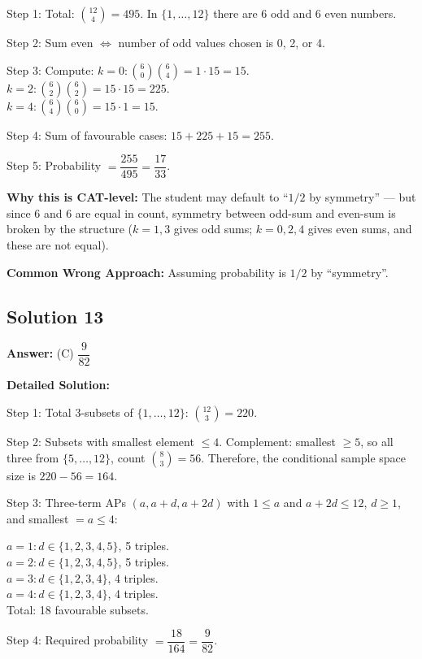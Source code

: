 \documentclass[11pt]{article}
\begin{document}
Step 1: Total: \( \binom{12}{4} = 495 \). In \( \{1,\ldots,12\} \) there are 6 odd and 6 even numbers.

Step 2: Sum even \( \Leftrightarrow \) number of odd values chosen is 0, 2, or 4.

Step 3: Compute:
\( k=0: \binom{6}{0}\binom{6}{4} = 1 \cdot 15 = 15. \) \\
\( k=2: \binom{6}{2}\binom{6}{2} = 15 \cdot 15 = 225. \) \\
\( k=4: \binom{6}{4}\binom{6}{0} = 15 \cdot 1 = 15. \)

Step 4: Sum of favourable cases: \( 15 + 225 + 15 = 255 \).

Step 5: Probability \( = \dfrac{255}{495} = \dfrac{17}{33} \).

\textbf{Why this is CAT-level:} The student may default to ``\( 1/2 \) by symmetry'' --- but since 6 and 6 are equal in count, symmetry between odd-sum and even-sum is broken by the structure (\( k = 1, 3 \) gives odd sums; \( k = 0, 2, 4 \) gives even sums, and these are not equal).

\textbf{Common Wrong Approach:} Assuming probability is \( 1/2 \) by ``symmetry''.

\subsection*{Solution 13}
\textbf{Answer:} (C) \( \dfrac{9}{82} \)

\textbf{Detailed Solution:}

Step 1: Total 3-subsets of \( \{1,\ldots,12\} \): \( \binom{12}{3} = 220 \).

Step 2: Subsets with smallest element \( \le 4 \). Complement: smallest \( \ge 5 \), so all three from \( \{5,\ldots,12\} \), count \( \binom{8}{3} = 56 \). Therefore, the conditional sample space size is \( 220 - 56 = 164 \).

Step 3: Three-term APs \( (a, a+d, a+2d) \) with \( 1 \le a \) and \( a + 2d \le 12 \), \( d \ge 1 \), and smallest \( = a \le 4 \):

\( a=1: d \in \{1,2,3,4,5\} \), 5 triples. \\
\( a=2: d \in \{1,2,3,4,5\} \), 5 triples. \\
\( a=3: d \in \{1,2,3,4\} \), 4 triples. \\
\( a=4: d \in \{1,2,3,4\} \), 4 triples. \\
Total: 18 favourable subsets.

Step 4: Required probability \( = \dfrac{18}{164} = \dfrac{9}{82} \).
\end{document}
